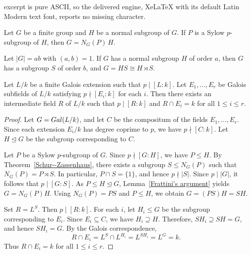 \documentclass[10pt,a4paper]{amsart}
\newcommand{\Gal}{{\rm Gal}}
\begin{document}
excerpt is pure ASCII, so the delivered engine, XeLaTeX with its default Latin Modern text font, reports no missing character.
\begin{lemma}[Frattini]\label{Frattini's argument}
Let $G$ be a finite group and $H$ be a normal subgroup of $G$. If $P$ is a Sylow $p$-subgroup of $H$, then $G=N_G(P)\,H$.
\end{lemma}

\begin{theorem}\label{Schur--Zassenhaus}
Let $|G|=ab$ with $(a,b)=1$. If $G$ has a normal subgroup $H$ of order $a$, then $G$ has a subgroup $S$ of order $b$, and $G=HS\cong H\rtimes S$.
\end{theorem}

\begin{lemma}\label{field-theory lemma}
Let \(L/k\) be a finite Galois extension such that \(p\mid [L:k]\). Let
\(E_1,\dots,E_r\) be Galois subfields of \(L/k\) satisfying
\(p\nmid [E_i:k]\) for each \(i\). Then there exists an intermediate field
\(R\) of \(L/k\) such that \(p\mid [R:k]\) and \(R\cap E_i=k\) for all
\(1\le i\le r\).
\end{lemma}

\begin{proof}
Let \(G=\Gal(L/k)\), and let \(C\) be the compositum of the fields
\(E_1,\dots,E_r\). Since each extension \(E_i/k\) has degree coprime to \(p\),
we have \(p\nmid [C:k]\). Let \(H\trianglelefteq G\) be the subgroup corresponding to \(C\).

Let \(P\) be a Sylow \(p\)-subgroup of \(G\). Since \(p\nmid [G:H]\), we have
\(P\le H\). By Theorem~\ref{Schur--Zassenhaus}, there exists a subgroup
\(S\le N_G(P)\) such that \(N_G(P)=P\rtimes S\). In particular, \(P\cap S=\{1\}\), and hence
\(p\nmid |S|\). Since \(p\mid |G|\), it follows that \(p\mid [G:S]\). As \(P\le H\trianglelefteq G\), Lemma~\ref{Frattini's argument} yields
\(G=N_G(P)H\). Using \(N_G(P)=PS\) and \(P\le H\), we obtain \(G=(PS)H=SH\).

Set \(R=L^S\). Then \(p\mid [R:k]\). For each \(i\), let \(H_i\le G\) be the
subgroup corresponding to \(E_i\). Since \(E_i\subseteq C\), we have
\(H_i\supseteq H\). Therefore,
\(SH_i\supseteq SH=G\), and hence \(SH_i=G\). By the Galois correspondence,
$$
R\cap E_i
=
L^S\cap L^{H_i}
=
L^{SH_i}
=
L^G
=
k.
$$
Thus \(R\cap E_i=k\) for all \(1 \le i \le r\).
\end{proof}
\end{document}
